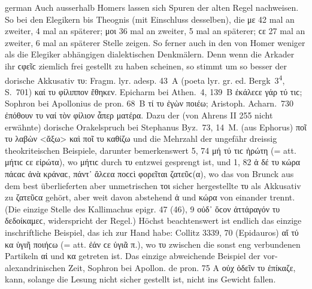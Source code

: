 \begin{otherlanguage*}{german}
Auch ausserhalb Homers lassen sich Spuren der alten Regel nachweisen. So bei den Elegikern bis Theognis (mit Einschluss desselben), die με 42 mal an zweiter, 4 mal an späterer; μοι 36 mal an zweiter, 5 mal an späterer; ϲε 27 mal an zweiter, 6 mal an späterer Stelle zeigen. So ferner auch in den von Homer weniger als die Elegiker abhängigen dialektischen Denkmälern. Denn wenn die Arkader ihr ϲφεῖϲ ziemlich frei gestellt zu haben scheinen, so stimmt um so besser der dorische Akkusativ τυ: Fragm. lyr. adesp. 43~Α (poeta lyr. gr. ed. Bergk~3\textsuperscript{4}, S.~701) καί τυ φίλιππον ἔθηκεν. Epicharm bei Athen.~4, 139~Β ἐκάλεϲε γάρ τύ τιϲ; Sophron bei Apollonius de pron. 68~Β τί τυ ἐγὼν ποιέω; Aristoph. Acharn.~730 ἐπόθουν τυ ναί τὸν φίλιον ἇπερ ματέρα. Dazu der (von Ahrens II 255 nicht erwähnte) dorische Orakelspruch bei Stephanus Byz.~73, 14~M. (aus Ephorus) ποῖ τυ λαβὼν <ἄξω> καὶ ποῖ τυ καθίζω und die Mehrzahl der ungefähr dreissig theokriteischen Beispiele, darunter bemerkenswert 5, 74 μή τύ τιϲ ἠρώτη (= att. μήτιϲ ϲε εἰρώτα), wo μήτιϲ durch τυ entzwei gesprengt ist, und 1, 82 ἁ δέ τυ κώρα πάϲαϲ ἀνὰ κράναϲ, πάντ᾽ ἄλϲεα ποϲϲὶ φορεῖται ζατεῦϲ(α), wo das von Brunck aus dem best überlieferten aber unmetrischen τοι sicher hergestellte τυ als Akkusativ zu ζατεῦϲα gehört, aber weit davon abstehend ἁ und κώρα von einander trennt. (Die einzige Stelle des Kallimachus epigr. 47 (46), 9 οὐδ᾽ ὅϲον ἀττάραγόν τυ δεδοίκαμεϲ, widerspricht der Regel.) Höchst beachtenswert ist endlich das einzige inschriftliche Beispiel, das ich zur Hand habe: Collitz 3339, 70 (Epidauros) αἴ τύ κα ὑγιῆ ποιήϲω (= att. ἐάν ϲε ὑγιᾶ π.), wo τυ zwischen die sonst eng verbundenen Partikeln αἰ und κα getreten ist. Das einzige abweichende Beispiel der vor-alexandrinischen Zeit, Sophron bei Apollon. de pron. 75 Α οὐχ ὁδεῖν τυ ἐπίκαζε, kann, solange die Lesung nicht sicher gestellt ist, nicht ins Gewicht fallen.


\end{otherlanguage*}
